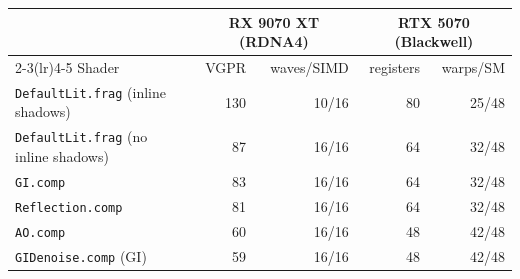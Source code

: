 \begin{tabular}{lrrrr}
\toprule
& \multicolumn{2}{c}{RX 9070 XT (RDNA4)} & \multicolumn{2}{c}{RTX 5070 (Blackwell)} \\
\cmidrule(lr){2-3}\cmidrule(lr){4-5}
Shader & VGPR & waves/SIMD & registers & warps/SM \\
\midrule
\texttt{DefaultLit.frag} (inline shadows) & 130 & 10/16 & 80 & 25/48 \\
\texttt{DefaultLit.frag} (no inline shadows) & 87 & 16/16 & 64 & 32/48 \\
\texttt{GI.comp} & 83 & 16/16 & 64 & 32/48 \\
\texttt{Reflection.comp} & 81 & 16/16 & 64 & 32/48 \\
\texttt{AO.comp} & 60 & 16/16 & 48 & 42/48 \\
\texttt{GIDenoise.comp} (GI) & 59 & 16/16 & 48 & 42/48 \\
\bottomrule
\end{tabular}
